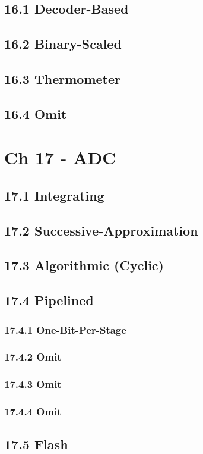 \documentclass[a4paper,twocolumn]{article}
\begin{document}
    \subsection{16.1 Decoder-Based}
    \subsection{16.2 Binary-Scaled}
    \subsection{16.3 Thermometer}
    \subsection{16.4 Omit}
  \section{Ch 17 - ADC}
    \subsection{17.1 Integrating}
    \subsection{17.2 Successive-Approximation}
    \subsection{17.3 Algorithmic (Cyclic)}
    \subsection{17.4 Pipelined}
      \subsubsection{17.4.1 One-Bit-Per-Stage}
      \subsubsection{17.4.2 Omit}
      \subsubsection{17.4.3 Omit}
      \subsubsection{17.4.4 Omit}
    \subsection{17.5 Flash}
\end{document}
